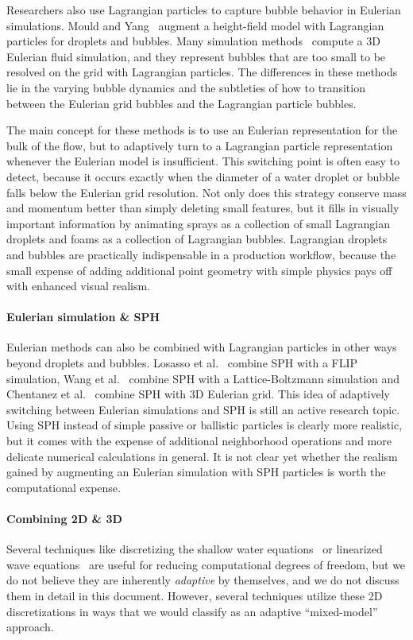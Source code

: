 Researchers also use Lagrangian particles to capture bubble behavior in Eulerian simulations. Mould and Yang~\cite{Mould1997} augment a height-field model with Lagrangian particles for droplets and bubbles. Many simulation methods~\cite{Greenwood:2004:BBE:1028523.1028562,Hong2008Bubbles,Patkar2013} compute a 3D Eulerian fluid simulation, and they represent bubbles that are too small to be resolved on the grid with Lagrangian particles. The differences in these methods lie in the varying bubble dynamics and the subtleties of how to transition between the Eulerian grid bubbles and the Lagrangian particle bubbles.

The main concept for these methods is to use an Eulerian representation for the bulk of the flow, but to adaptively turn to a Lagrangian particle representation whenever the Eulerian model is insufficient. This switching point is often easy to detect, because it occurs exactly when the diameter of a water droplet or bubble falls below the Eulerian grid resolution. Not only does this strategy conserve mass and momentum better than simply deleting small features, but it fills in visually important information by animating sprays as a collection of small Lagrangian droplets and foams as a collection of Lagrangian bubbles. Lagrangian droplets and bubbles are practically indispensable in a production workflow, because the small expense of adding additional point geometry with simple physics pays off with enhanced visual realism.

\paragraph*{Eulerian simulation \& SPH}
Eulerian methods can also be combined with Lagrangian particles in other ways beyond droplets and bubbles.
Losasso et al.~\cite{Losasso2008} combine SPH with a FLIP simulation, Wang et al.~\cite{Wang2013} combine SPH with a Lattice-Boltzmann simulation and Chentanez et al.~\cite{Chentanez2014} combine SPH with 3D Eulerian grid.
This idea of adaptively switching between Eulerian simulations and SPH is still an active research topic. Using SPH instead of simple passive or ballistic particles is clearly more realistic, but it comes with the expense of additional neighborhood operations and more delicate numerical calculations in general. It is not clear yet whether the realism gained by augmenting an Eulerian simulation with SPH particles is worth the computational expense.

\paragraph*{Combining 2D \& 3D}
Several techniques like discretizing the shallow water equations~\cite{layton2002numerically,hagen2005visual} or linearized wave equations~\cite{kass1990rapid,tessendorf2004interactive,keeler2014ocean} are useful for reducing computational degrees of freedom, but we do not believe they are inherently {\em adaptive} by themselves, and we do not discuss them in detail in this document. However, several techniques utilize these 2D discretizations in ways that we would classify as an adaptive ``mixed-model'' approach.

